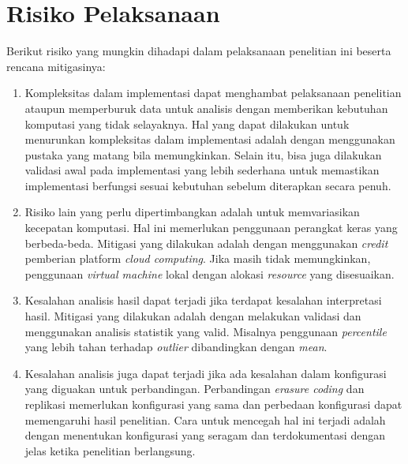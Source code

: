 \section{Risiko Pelaksanaan}
\label{sec:risiko-pelaksanaan}
Berikut risiko yang mungkin dihadapi dalam pelaksanaan penelitian ini beserta rencana mitigasinya:

\begin{enumerate}
	\item Kompleksitas dalam implementasi dapat menghambat pelaksanaan penelitian ataupun memperburuk data untuk analisis dengan memberikan kebutuhan komputasi yang tidak selayaknya. Hal yang dapat dilakukan untuk menurunkan kompleksitas dalam implementasi adalah dengan menggunakan pustaka yang matang bila memungkinkan. Selain itu, bisa juga dilakukan validasi awal pada implementasi yang lebih sederhana untuk memastikan implementasi berfungsi sesuai kebutuhan sebelum diterapkan secara penuh.
	\item Risiko lain yang perlu dipertimbangkan adalah untuk memvariasikan kecepatan komputasi. Hal ini memerlukan penggunaan perangkat keras yang berbeda-beda. Mitigasi yang dilakukan adalah dengan menggunakan \textit{credit} pemberian platform \textit{cloud computing}. Jika masih tidak memungkinkan, penggunaan \textit{virtual machine} lokal dengan alokasi \textit{resource} yang disesuaikan.
	\item Kesalahan analisis hasil dapat terjadi jika terdapat kesalahan interpretasi hasil. Mitigasi yang dilakukan adalah dengan melakukan validasi dan menggunakan analisis statistik yang valid. Misalnya penggunaan \textit{percentile} yang lebih tahan terhadap \textit{outlier} dibandingkan dengan \textit{mean}.
	\item Kesalahan analisis juga dapat terjadi jika ada kesalahan dalam konfigurasi yang diguakan untuk perbandingan. Perbandingan \textit{erasure coding} dan replikasi memerlukan konfigurasi yang sama dan perbedaan konfigurasi dapat memengaruhi hasil penelitian. Cara untuk mencegah hal ini terjadi adalah dengan menentukan konfigurasi yang seragam dan terdokumentasi dengan jelas ketika penelitian berlangsung.
\end{enumerate}